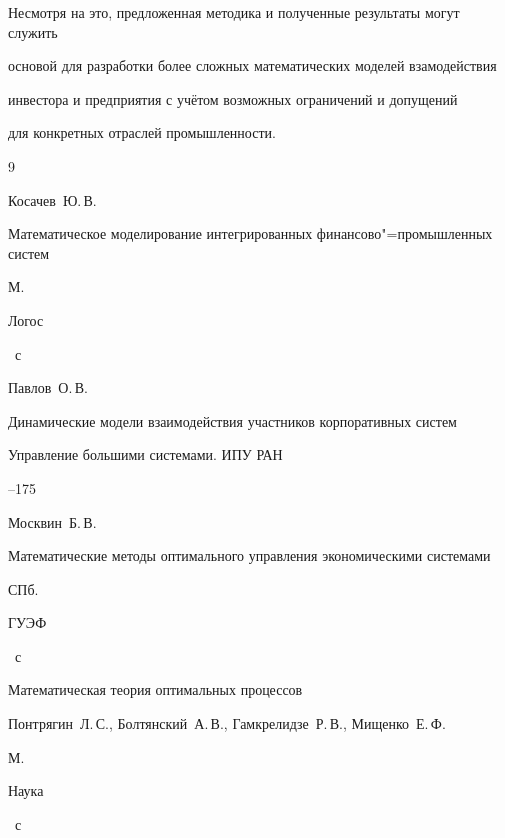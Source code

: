 Несмотря на это, предложенная методика и полученные результаты могут служить 

основой для разработки более сложных математических моделей взамодействия 

инвестора и предприятия с учётом возможных ограничений и допущений 

для конкретных отраслей промышленности.







\begin{thebibliography}{9}




\by Косачев~Ю.\,В.

\book Математическое моделирование интегрированных финансово"=промышленных систем  

\publaddr М.

\publ Логос


~с




\by Павлов~О.\,В.

\paper Динамические модели взаимодействия участников корпоративных систем 

\jour  Управление большими системами. ИПУ РАН



--175




\by Москвин~Б.\,В.

\book Математические методы оптимального управления экономическими системами 

\publaddr СПб.

\publ ГУЭФ


~с




\book Математическая теория оптимальных процессов 

\by Понтрягин~Л.\,С., Болтянский~А.\,В., Гамкрелидзе~Р.\,В., Мищенко~Е.\,Ф. 

\publaddr М.

\publ Наука


~с





\end{thebibliography}



\newpage $\;$ 



\vspace{-20mm}

\makeengtitlem









%